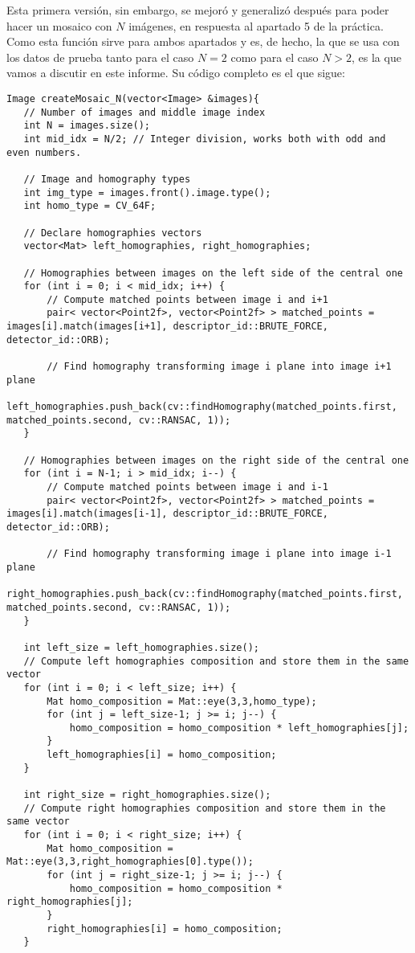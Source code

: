 \documentclass[a4paper, 11pt]{article}
\theoremstyle{definition}
\theoremstyle{theorem}
\begin{document}
   Esta primera versión, sin embargo, se mejoró y generalizó después para poder hacer un mosaico con $N$ imágenes, en respuesta al apartado 5 de la práctica. Como esta función sirve para ambos apartados y es, de hecho, la que se usa con los datos de prueba tanto para el caso $N=2$ como para el caso $N>2$, es la que vamos a discutir en este informe. Su código completo es el que sigue:
   \begin{lstlisting}
Image createMosaic_N(vector<Image> &images){
   // Number of images and middle image index
   int N = images.size();
   int mid_idx = N/2; // Integer division, works both with odd and even numbers.

   // Image and homography types
   int img_type = images.front().image.type();
   int homo_type = CV_64F;

   // Declare homographies vectors
   vector<Mat> left_homographies, right_homographies;

   // Homographies between images on the left side of the central one
   for (int i = 0; i < mid_idx; i++) {
       // Compute matched points between image i and i+1
       pair< vector<Point2f>, vector<Point2f> > matched_points = images[i].match(images[i+1], descriptor_id::BRUTE_FORCE, detector_id::ORB);

       // Find homography transforming image i plane into image i+1 plane
       left_homographies.push_back(cv::findHomography(matched_points.first, matched_points.second, cv::RANSAC, 1));
   }

   // Homographies between images on the right side of the central one
   for (int i = N-1; i > mid_idx; i--) {
       // Compute matched points between image i and i-1
       pair< vector<Point2f>, vector<Point2f> > matched_points = images[i].match(images[i-1], descriptor_id::BRUTE_FORCE, detector_id::ORB);

       // Find homography transforming image i plane into image i-1 plane
       right_homographies.push_back(cv::findHomography(matched_points.first, matched_points.second, cv::RANSAC, 1));
   }

   int left_size = left_homographies.size();
   // Compute left homographies composition and store them in the same vector
   for (int i = 0; i < left_size; i++) {
       Mat homo_composition = Mat::eye(3,3,homo_type);
       for (int j = left_size-1; j >= i; j--) {
           homo_composition = homo_composition * left_homographies[j];
       }
       left_homographies[i] = homo_composition;
   }

   int right_size = right_homographies.size();
   // Compute right homographies composition and store them in the same vector
   for (int i = 0; i < right_size; i++) {
       Mat homo_composition = Mat::eye(3,3,right_homographies[0].type());
       for (int j = right_size-1; j >= i; j--) {
           homo_composition = homo_composition * right_homographies[j];
       }
       right_homographies[i] = homo_composition;
   }


\end{lstlisting}
\end{document}
